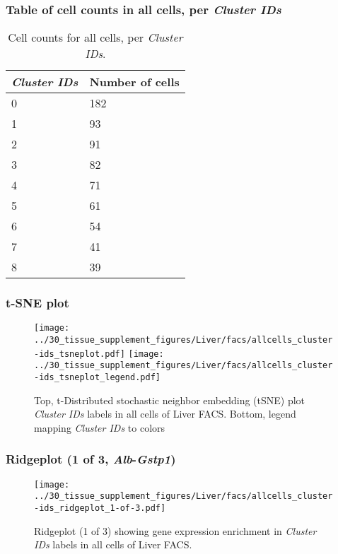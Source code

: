 \subsubsection{Table of cell counts in all cells, per \emph{Cluster IDs}}\begin{table}[h]
\centering
\label{my-label}
\begin{tabular}{@{}ll@{}}
\toprule

\emph{Cluster IDs}& Number of cells \\ \midrule
0 & 182 \\

1 & 93 \\

2 & 91 \\

3 & 82 \\

4 & 71 \\

5 & 61 \\

6 & 54 \\

7 & 41 \\

8 & 39 \\
\bottomrule
\end{tabular}
\caption{Cell counts for all cells, per \emph{Cluster IDs}.}
\end{table}

\clearpage
\subsubsection{t-SNE plot}
\begin{figure}[h]
\centering
\texttt{[image: ../30\_tissue\_supplement\_figures/Liver/facs/allcells\_cluster-ids\_tsneplot.pdf]}
\texttt{[image: ../30\_tissue\_supplement\_figures/Liver/facs/allcells\_cluster-ids\_tsneplot\_legend.pdf]}
\caption{Top, t-Distributed stochastic neighbor embedding (tSNE) plot  \emph{Cluster IDs} labels in all cells of Liver FACS. Bottom, legend mapping \emph{Cluster IDs} to colors}
\end{figure}


\clearpage

\subsubsection{Ridgeplot (1 of 3, \emph{Alb}-\emph{Gstp1})}
\begin{figure}[h]
\centering
\texttt{[image: ../30\_tissue\_supplement\_figures/Liver/facs/allcells\_cluster-ids\_ridgeplot\_1-of-3.pdf]}

\caption{ Ridgeplot (1 of 3)  showing gene expression enrichment in \emph{Cluster IDs} labels in all cells of Liver FACS. }
\end{figure}


